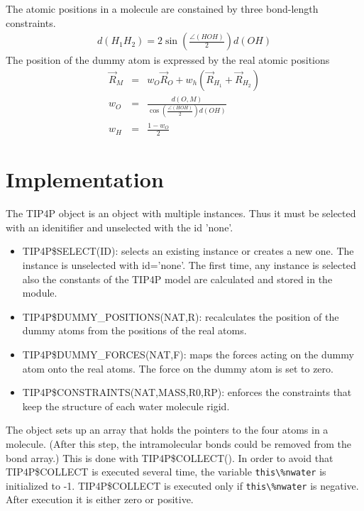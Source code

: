 \documentclass[11pt,a4paper]{report}
\begin{document}
The atomic positions in a molecule are constained by three bond-length
constraints. 
\begin{eqnarray}
d(H_1H_2)=2 \sin\left(\frac{\angle(HOH)}{2}\right) d(OH)
\end{eqnarray}
The position of the dummy atom is expressed by the real atomic positions
\begin{eqnarray}
\vec{R}_M&=&w_O \vec{R}_O+w_h\left(\vec{R}_{H_1}+\vec{R}_{H_2}\right)
\nonumber\\
w_O&=&\frac{d(O,M)}{\cos\left(\frac{\angle(HOH)}{2}\right) d(OH)}
\\
w_H&=&\frac{1-w_O}{2}
\end{eqnarray}
\section{Implementation}
The TIP4P object is an object with multiple instances. Thus it must be
selected with an idenitifier and unselected with the id 'none'.

\begin{itemize}
\item TIP4P\$SELECT(ID): selects an existing instance or creates a new
  one. The instance is unselected with id='none'. The first time, any
  instance is selected also the constants of the TIP4P model are
  calculated and stored in the module.
%
\item TIP4P\$DUMMY\_POSITIONS(NAT,R): recalculates the position of the dummy
  atoms from the positions of the real atoms.
%
\item TIP4P\$DUMMY\_FORCES(NAT,F): maps the forces acting on the dummy atom
  onto the real atoms. The force on  the dummy atom is set to zero.
%
\item TIP4P\$CONSTRAINTS(NAT,MASS,R0,RP): enforces the constraints
  that keep the structure of each water molecule rigid.
\end{itemize}

The object sets up an array that holds the pointers to the four atoms
in a molecule. (After this step, the intramolecular bonds could be
removed from the bond array.) This is done with TIP4P\$COLLECT().  In
order to avoid that TIP4P\$COLLECT is executed several time, the
variable \verb|this\%nwater| is initialized to -1. TIP4P\$COLLECT is
executed only if \verb|this\%nwater| is negative. After execution it
is either zero or positive.
\end{document}
